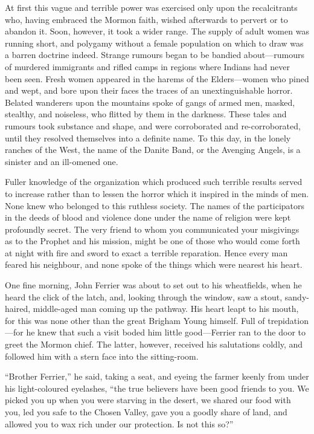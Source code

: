 \documentclass[12pt,english,oneside]{book}
\newcommand{\mdsh}[1]{\mbox{#1}\linebreak[1]}
\begin{document}
At first this vague and terrible power was exercised only upon the
recalcitrants who, having embraced the Mormon faith, wished afterwards
to pervert or to abandon it. Soon, however, it took a wider range.
The supply of adult women was running short, and polygamy without
a female population on which to draw was a barren doctrine indeed.
Strange rumours began to be bandied about\mdsh{---}rumours of murdered
immigrants and rifled camps in regions where Indians had never been
seen. Fresh women appeared in the harems of the Elders\mdsh{---}women
who pined and wept, and bore upon their faces the traces of an unextinguishable
horror. Belated wanderers upon the mountains spoke of gangs of armed
men, masked, stealthy, and noiseless, who flitted by them in the darkness.
These tales and rumours took substance and shape, and were corroborated
and re-corroborated, until they resolved themselves into a definite
name. To this day, in the lonely ranches of the West, the name of
the Danite Band, or the Avenging Angels, is a sinister and an ill-omened
one.

Fuller knowledge of the organization which produced such terrible
results served to increase rather than to lessen the horror which
it inspired in the minds of men. None knew who belonged to this ruthless
society. The names of the participators in the deeds of blood and
violence done under the name of religion were kept profoundly secret.
The very friend to whom you communicated your misgivings as to the
Prophet and his mission, might be one of those who would come forth
at night with fire and sword to exact a terrible reparation. Hence
every man feared his neighbour, and none spoke of the things which
were nearest his heart.

One fine morning, John Ferrier was about to set out to his wheatfields,
when he heard the click of the latch, and, looking through the window,
saw a stout, sandy-haired, middle-aged man coming up the pathway.
His heart leapt to his mouth, for this was none other than the great
Brigham Young himself. Full of trepidation\mdsh{---}for he knew that
such a visit boded him little good\mdsh{---}Ferrier ran to the door
to greet the Mormon chief. The latter, however, received his salutations
coldly, and followed him with a stern face into the sitting-room.

{}``Brother Ferrier,'' he said, taking a seat, and eyeing the farmer
keenly from under his light-coloured eyelashes, {}``the true believers
have been good friends to you. We picked you up when you were starving
in the desert, we shared our food with you, led you safe to the Chosen
Valley, gave you a goodly share of land, and allowed you to wax rich
under our protection. Is not this so?''
\end{document}
